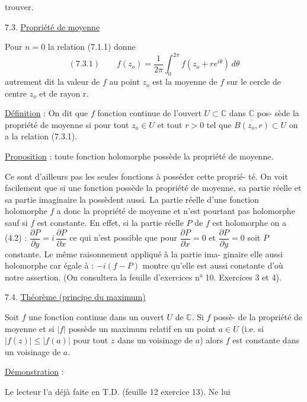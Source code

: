
trouver.

7.3. \uline{Propriété de moyenne}

Pour $n = 0$ la relation (7.1.1) donne
\[ (7.3.1) \qquad f(z_o) = \frac{1}{2\pi}\int_0^{2\pi} f(z_o + re^{i\theta})\, d\theta \]
autrement dit la valeur de $f$ au point $z_o$ est la moyenne de $f$ sur le cercle
de centre $z_o$ et de rayon r.

\uline{Définition} : On dit que $f$ fonction continue de l'ouvert $U \subset \mathbb{C}$ dans $\mathbb{C}$ pos-%
sède la propriété de moyenne si pour tout $z_o \in U$ et tout $r > 0$ tel que
$\overline{B(z_o,r)} \subset U$ on a la relation (7.3.1).

\uline{Proposition} : toute fonction holomorphe possède la propriété de moyenne.

Ce sont d'ailleurs pas les seules fonctions à posséder cette proprié-%
té. On voit facilement que si une fonction possède la propriété de moyenne, sa
partie réelle et sa partie imaginaire la possèdent aussi. La partie réelle d'une
fonction holomorphe $f$ a donc la propriété de moyenne et n'est pourtant pas
holomorphe sauf si $f$ est constante. En effet, si la partie réelle $P$ de $f$
est holomorphe on a (4.2) : $\dfrac{\partial P}{\partial y} = i\,\dfrac{\partial P}{\partial x}$ ce qui n'est possible que pour $\dfrac{\partial P}{\partial x} = 0$
et $\dfrac{\partial P}{\partial y} = 0$ soit $P$ constante. Le même raisonnement appliqué à la partie ima-%
ginaire elle aussi holomorphe car égale à : $-i(f-P)$ montre qu'elle est aussi
constante d'où notre assertion.
(On consultera la feuille d'exercices n° 10. Exercices 3 et 4).

7.4. \uline{Théorème (principe du maximum)}

Soit $f$ une fonction continue dans un ouvert $U$ de $\mathbb{C}$. Si $f$ possè-%
de la propriété de moyenne et si $|f|$ possède un maximum relatif en un point
$a \in U$ (i.e. si $|f(z)| \leq |f(a)|$ pour tout $z$ dans un voisinage de $a$) alors
$f$ est constante dans un voisinage de $a$.

\uline{Démonstration} :

Le lecteur l'a déjà faite en T.D. (feuille 12 exercice 13). Ne lui

